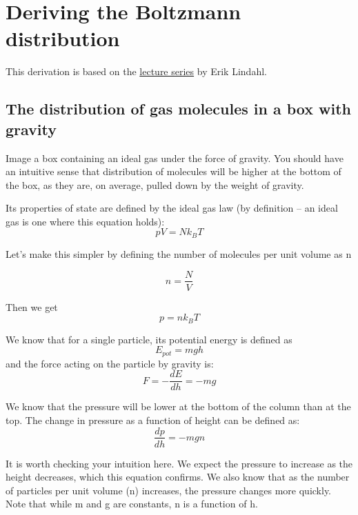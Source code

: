 \section{Deriving the Boltzmann distribution}

This derivation is based on the \href{https://www.youtube.com/watch?v=_6AFgt2gkr0&list=PLuIpgNT2hMwTyjpKVevMHUofykrXFtNVW&index=4}{lecture series} by Erik Lindahl. 

\subsection{The distribution of gas molecules in a box with gravity}

Image a box containing an ideal gas under the force of gravity.
You should have an intuitive sense that distribution of molecules will be higher at the bottom of the box, as they are, on average, pulled down by the weight of gravity.

Its properties of state are defined by the ideal gas law (by definition -- an ideal gas is one where this equation holds):
\begin{equation}
    pV = Nk_BT
\end{equation}

Let's make this simpler by defining the number of molecules per unit volume as n

\begin{equation}
    n = \frac{N}{V}
\end{equation}

Then we get 
\begin{equation}
    p = nk_BT \label{eq:ideal_simple}
\end{equation}

We know that for a single particle, its potential energy is defined as
\begin{equation}
    E_{pot} = mgh
\end{equation}
and the force acting on the particle by gravity is:
\begin{equation}
    F = -\dfrac{dE}{dh} = -mg
\end{equation}

We know that the pressure will be lower at the bottom of the column than at the top.
The change in pressure as a function of height can be defined as:
\begin{equation}
    \dfrac{dp}{dh} = -mgn \label{eq:pressure_derivative}
\end{equation}

It is worth checking your intuition here. 
We expect the pressure to increase as the height decreases, which this equation confirms.
We also know that as the number of particles per unit volume (n) increases, the pressure changes more quickly.
Note that while m and g are constants, n is a function of h.

